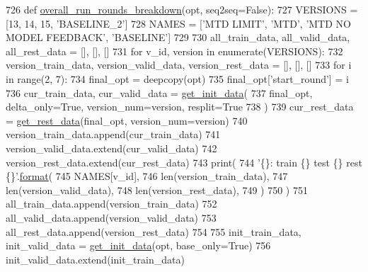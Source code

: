 \begin{DoxyCode}
726 \textcolor{keyword}{def }\hyperlink{namespaceprojects_1_1mastering__the__dungeon_1_1mturk_1_1tasks_1_1MTD_1_1run_a9bd2ed10dc695764b3b3f40163c98dae}{overall\_run\_rounds\_breakdown}(opt, seq2seq=False):
727     VERSIONS = [13, 14, 15, \textcolor{stringliteral}{'BASELINE\_2'}]
728     NAMES = [\textcolor{stringliteral}{'MTD LIMIT'}, \textcolor{stringliteral}{'MTD'}, \textcolor{stringliteral}{'MTD NO MODEL FEEDBACK'}, \textcolor{stringliteral}{'BASELINE'}]
729 
730     all\_train\_data, all\_valid\_data, all\_rest\_data = [], [], []
731     \textcolor{keywordflow}{for} v\_id, version \textcolor{keywordflow}{in} enumerate(VERSIONS):
732         version\_train\_data, version\_valid\_data, version\_rest\_data = [], [], []
733         \textcolor{keywordflow}{for} i \textcolor{keywordflow}{in} range(2, 7):
734             final\_opt = deepcopy(opt)
735             final\_opt[\textcolor{stringliteral}{'start\_round'}] = i
736             cur\_train\_data, cur\_valid\_data = \hyperlink{namespaceprojects_1_1mastering__the__dungeon_1_1mturk_1_1tasks_1_1MTD_1_1run_ae84843b54586b020d47c60d95340e1d7}{get\_init\_data}(
737                 final\_opt, delta\_only=\textcolor{keyword}{True}, version\_num=version, resplit=\textcolor{keyword}{True}
738             )
739             cur\_rest\_data = \hyperlink{namespaceprojects_1_1mastering__the__dungeon_1_1mturk_1_1tasks_1_1MTD_1_1run_ae9acbe1fe240a624b01fed3f073cc780}{get\_rest\_data}(final\_opt, version\_num=version)
740             version\_train\_data.append(cur\_train\_data)
741             version\_valid\_data.extend(cur\_valid\_data)
742             version\_rest\_data.extend(cur\_rest\_data)
743         print(
744             \textcolor{stringliteral}{'\{\}: train \{\} test \{\} rest \{\}'}.\hyperlink{namespaceparlai_1_1chat__service_1_1services_1_1messenger_1_1shared__utils_a32e2e2022b824fbaf80c747160b52a76}{format}(
745                 NAMES[v\_id],
746                 len(version\_train\_data),
747                 len(version\_valid\_data),
748                 len(version\_rest\_data),
749             )
750         )
751         all\_train\_data.append(version\_train\_data)
752         all\_valid\_data.append(version\_valid\_data)
753         all\_rest\_data.append(version\_rest\_data)
754 
755     init\_train\_data, init\_valid\_data = \hyperlink{namespaceprojects_1_1mastering__the__dungeon_1_1mturk_1_1tasks_1_1MTD_1_1run_ae84843b54586b020d47c60d95340e1d7}{get\_init\_data}(opt, base\_only=\textcolor{keyword}{True})
756     init\_valid\_data.extend(init\_train\_data)

\end{DoxyCode}
